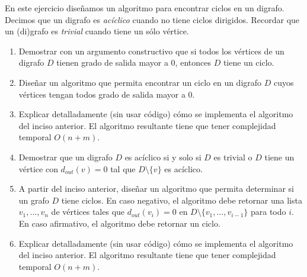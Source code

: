 
 
 \item\Obligatorio En este ejercicio diseñamos un algoritmo para encontrar ciclos en un digrafo.  Decimos que un digrafo es \emph{acíclico} cuando no tiene ciclos dirigidos.  Recordar que un (di)grafo es \emph{trivial} cuando tiene un sólo vértice.
 \begin{enumerate}[label=$\alph*)$,ref=$\alph*)$]
   \item Demostrar con un argumento constructivo que si todos los vértices de un digrafo $D$ tienen grado de salida mayor a $0$, entonces $D$ tiene un ciclo.
   \item Diseñar un algoritmo que permita encontrar un ciclo en un digrafo $D$ cuyos vértices tengan todos grado de salida mayor a $0$.
   \item Explicar detalladamente (sin usar código) cómo se implementa el algoritmo del inciso anterior.  El algoritmo resultante tiene que tener complejidad temporal $O(n+m)$. 
   \item Demostrar que un digrafo $D$ es acíclico si y solo si $D$ es trivial o $D$ tiene un vértice con $d_{out}(v) = 0$ tal que $D \setminus \{v\}$ es acíclico.
   \item A partir del inciso anterior, diseñar un algoritmo que permita determinar si un grafo $D$ tiene ciclos.  En caso negativo, el algoritmo debe retornar una lista $v_1, \ldots, v_n$ de vértices tales que $d_{out}(v_i) = 0$ en $D \setminus \{v_1,\ldots, v_{i-1}\}$ para todo $i$.  En caso afirmativo, el algoritmo debe retornar un ciclo.
   \item Explicar detalladamente (sin usar código) cómo se implementa el algoritmo del inciso anterior. El algoritmo resultante tiene que tener complejidad temporal $O(n+m)$. 
 \end{enumerate}
 
